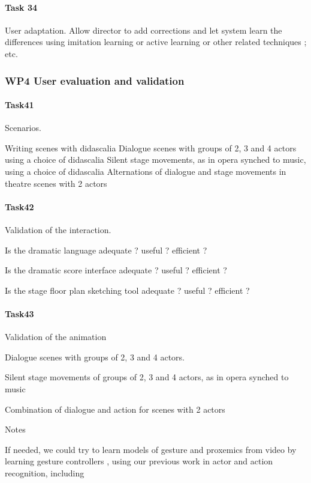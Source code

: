 \paragraph{Task 34} User adaptation.
Allow director to add corrections and let system learn the differences using imitation learning or active learning or other related techniques ; etc.


\subsubsection{WP4 User evaluation and validation}

\paragraph{Task41} Scenarios.

Writing scenes with didascalia 
Dialogue scenes with groups of 2, 3 and 4 actors using a choice of didascalia
Silent stage movements, as in opera synched to music, using a choice of didascalia
Alternations of dialogue and stage movements in theatre scenes with 2 actors

\paragraph{Task42} Validation of the interaction.

Is the dramatic language adequate ? useful ?  efficient  ? 

Is the dramatic score interface  adequate ? useful ?  efficient  ? 

Is the stage floor plan sketching tool adequate ? useful ?  efficient  ? 

\paragraph{Task43} Validation of the animation

Dialogue scenes  with groups of 2, 3 and 4 actors.

Silent stage movements of groups of 2, 3 and 4 actors, as in opera synched to music

Combination of dialogue and action for scenes with 2 actors



Notes


If needed, we could try to learn models of gesture and proxemics from video by learning gesture controllers \cite{Levine2010},
using  our previous work in actor and action recognition, including

